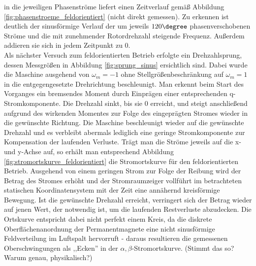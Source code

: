 \noindent in die jeweiligen Phasenströme liefert einen Zeitverlauf gemäß Abbildung \ref{fig:phasenstroeme_feldorientiert} (nicht direkt gemessen). Zu erkennen ist deutlich der sinusförmige Verlauf der um jeweils $120 \degree$ phasenverschobenen Ströme und die mit zunehmender Rotordrehzahl steigende Frequenz. Außerdem addieren sie sich in jedem Zeitpunkt zu 0.\\ 
\noindent Als nächster Versuch zum feldorientierten Betrieb erfolgte ein Drehzahlsprung, dessen Messgrößen in Abbildung \ref{fig:sprung_sinus} ersichtlich sind. Dabei wurde die Maschine ausgehend von $\omega_m=-1$ ohne Stellgrößenbeschränkung auf $\omega_m=1$ in die entgegengesetzte Drehrichtung beschleunigt. Man erkennt beim Start des Vorganges ein bremsendes Moment durch Einprägen einer entsprechenden q-Stromkomponente. Die Drehzahl sinkt, bis sie 0 erreicht, und steigt anschließend aufgrund des wirkenden Momentes zur Folge des eingeprägten Stromes wieder in die gewünschte Richtung. Die Maschine beschleunigt wieder auf die gewünschte Drehzahl und es verbleibt abermals lediglich eine geringe Stromkomponente zur Kompensation der laufenden Verluste. Trägt man die Ströme jeweils auf die x- und y-Achse auf, so erhält man entsprechend Abbildung \ref{fig:stromortskurve_feldorientiert} die Stromortskurve für den feldorientierten Betrieb. Ausgehend von einem geringen Strom zur Folge der Reibung wird der Betrag des Stromes erhöht und der Stromraumzeiger vollführt im betrachteten statischen Koordinatensystem mit der Zeit eine annähernd kreisförmige Bewegung. Ist die gewünschte Drehzahl erreicht, verringert sich der Betrag wieder auf jenen Wert, der notwendig ist, um die laufenden Restverluste abzudecken. Die Ortskurve entspricht dabei nicht perfekt einem Kreis, da die diskrete Oberflächenanordnung der Permanentmagnete eine nicht sinusförmige Feldverteilung im Luftspalt hervorruft - daraus resultieren die gemessenen Oberschwingungen als ,,Ecken'' in der $\alpha,\beta$-Stromortskurve. (Stimmt das so? Warum genau, physikalisch?)









